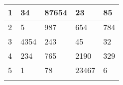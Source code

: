 \begin{table}[htbp]
\centering
\begin{tabular}{lllll}
\hline

1 & 34   & 87654 & 23    & 85  \\ \hline
2 & 5    & 987   & 654   & 784 \\
3 & 4354 & 243   & 45    & 32  \\
4 & 234  & 765   & 2190  & 329 \\
5 & 1    & 78    & 23467 & 6   \\
  &      &       &       &     \\ \hline
\end{tabular}
\end{table}